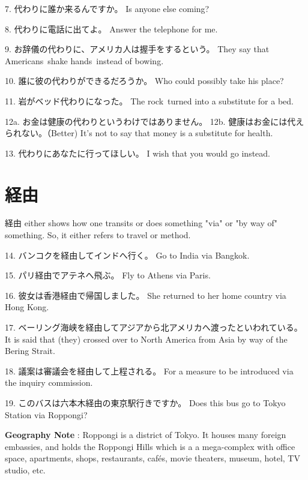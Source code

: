 \par{7. 代わりに誰か来るんですか。 \hfill\break
Is anyone else coming? }
 
\par{8. 代わりに電話に出てよ。 \hfill\break
Answer the telephone for me. }
 
\par{9. お辞儀の代わりに、アメリカ人は握手をするという。 \hfill\break
They say that Americans shake hands instead of bowing. }
 
\par{10. 誰に彼の代わりができるだろうか。 \hfill\break
Who could possibly take his place? }
 
\par{11. 岩がベッド代わりになった。 \hfill\break
The rock turned into a substitute for a bed. }
 
\par{12a. お金は健康の代わりというわけではありません。 \hfill\break
12b. 健康はお金には代えられない。（Better) \hfill\break
It's not to say that money is a substitute for health. }
 
\par{13. 代わりにあなたに行ってほしい。 \hfill\break
I wish that you would go instead. }
      
\section{経由}
 
\par{ 経由 either shows how one transits or does  something "via" or "by way of" something. So, it either refers to travel  or method. }

\par{14. バンコクを経由してインドへ行く。 \hfill\break
Go to India via Bangkok. }

\par{15. パリ経由でアテネへ飛ぶ。 \hfill\break
Fly to Athens via Paris. }

\par{16. 彼女は香港経由で帰国しました。 \hfill\break
She returned to her home country via Hong Kong. }

\par{17. ベーリング海峡を経由してアジアから北アメリカへ渡ったといわれている。 \hfill\break
It is said that (they) crossed over to North America from Asia by way of the Bering Strait. }

\par{18. 議案は審議会を経由して上程される。 \hfill\break
For a measure to be introduced via the inquiry commission. }

\par{19. このバスは六本木経由の東京駅行きですか。 \hfill\break
Does this bus go to Tokyo Station via Roppongi? }

\par{\textbf{Geography Note }: Roppongi is a district of Tokyo. It houses many foreign embassies, and holds the Roppongi Hills which is a a mega-complex with office space, apartments, shops, restaurants,  cafés, movie theaters, museum, hotel, TV studio, etc. }
    